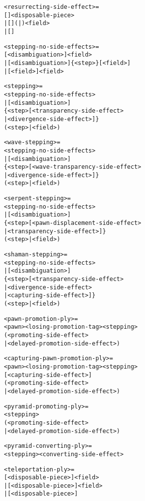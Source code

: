 \clearpage %

\begin{alltt}
<resurrecting-side-effect> =
  \alg{$}[\alg{$}]<disposable-piece>
| \alg{$}[\alg{$}](|)<field>
| [\alg{$$$}]

<stepping-no-side-effects> =
  [<disambiguation>]<field>
| [<disambiguation>]\{<step>\}[\alg{-}<field>]
| [<field>\alg{-}]<field>

<stepping> =
  <stepping-no-side-effects>
| [<disambiguation>]
  \{<step>[<transparency-side-effect>
          | <divergence-side-effect>]\}
  (<step> | \alg{-}<field>)

<wave-stepping> =
  <stepping-no-side-effects>
| [<disambiguation>]
  \{<step>[<wave-transparency-side-effect>
          | <divergence-side-effect>]\}
  (<step> | \alg{-}<field>)

<serpent-stepping> =
  <stepping-no-side-effects>
| [<disambiguation>]
  \{<step>[<pawn-displacement-side-effect>
          | <transparency-side-effect>]\}
  (<step> | \alg{-}<field>)

\end{alltt}

\clearpage %

\begin{alltt}
<shaman-stepping> =
  <stepping-no-side-effects>
| [<disambiguation>]
  \{<step>[<transparency-side-effect>
          | <divergence-side-effect>
          | <capturing-side-effect>]\}
  (<step> | \alg{-}<field>)

<pawn-promotion-ply> =
  <pawn><losing-promotion-tag><stepping>
  (<promoting-side-effect>
   | <delayed-promotion-side-effect>)

<capturing-pawn-promotion-ply> =
  <pawn><losing-promotion-tag><stepping>
  [<capturing-side-effect>]
  (<promoting-side-effect>
   | <delayed-promotion-side-effect>)

<pyramid-promoting-ply> =
  <stepping>
  (<promoting-side-effect>
   | <delayed-promotion-side-effect>)

<pyramid-converting-ply> =
  <stepping><converting-side-effect>

<teleportation-ply> =
  \alg{|}[<disposable-piece>]<field>
| \alg{||}[<disposable-piece>]<field>
| \alg{|||}[<disposable-piece>]
\end{alltt}

\clearpage %


